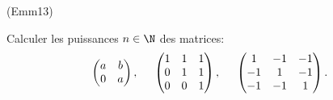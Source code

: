 \begin{tiny}(Emm13)\end{tiny} Calculer les puissances $n\in\N$ des matrices:
\begin{displaymath}
 \begin{pmatrix}
  a & b \\ 0 & a
 \end{pmatrix},
\hspace{0.5cm}
\begin{pmatrix}
 1& 1 & 1 \\ 0 & 1 & 1\\ 0& 0 & 1
\end{pmatrix},
\hspace{0.5cm}
\begin{pmatrix}
 1& -1 & -1 \\ -1 & 1 & -1\\ -1 & -1 & 1
\end{pmatrix} .
\end{displaymath}
 
